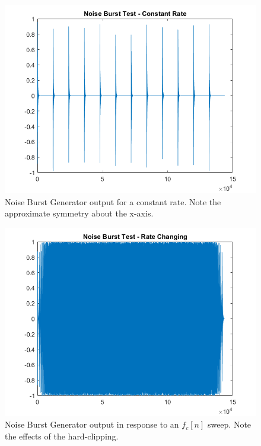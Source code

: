 \documentclass[../main.tex]{subfiles}
\begin{document}
\begin{figure}[hb]
    \centering
    \includegraphics[scale=.65]{./images/plots/NBGTest1.png}
    \caption{Noise Burst Generator output for a constant rate. Note the approximate symmetry about the x-axis.}
    \label{fig:NBGT1}
\end{figure}

\begin{figure}[ht]
    \centering
    \includegraphics[scale=.65]{./images/plots/NBGTest2.png}
    \caption{Noise Burst Generator output in response to an $f_c[n]$ sweep. Note the effects of the hard-clipping.}
    \label{fig:NBGT2}
\end{figure}
\end{document}
